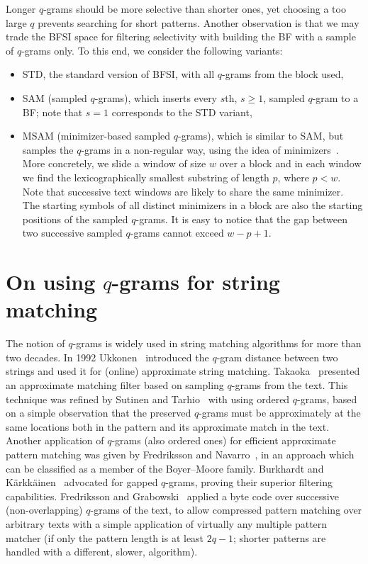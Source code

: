 \documentclass{llncs}
\begin{document}
Longer $q$-grams should be more selective than shorter ones, 
yet choosing a too large $q$ prevents searching for short patterns.
Another observation is that we may trade the BFSI space for filtering 
selectivity with building the BF with a sample of $q$-grams only.
To this end, we consider the following variants:
\begin{itemize}
\item STD, the standard version of BFSI, with all $q$-grams from the block used,
\item SAM (sampled $q$-grams), which inserts every $s$th, $s \geq 1$, 
sampled $q$-gram to a BF; note that $s=1$ corresponds to the STD variant,
\item MSAM (minimizer-based sampled $q$-grams), which is similar to SAM, 
but samples the $q$-grams in a non-regular way, using the idea of 
minimizers~\cite{RHHMY2004}.
More concretely, we slide a window of size $w$ over a block 
and in each window we find the lexicographically smallest substring of length $p$, 
where $p < w$.
Note that successive text windows are likely to share the same minimizer.
The starting symbols of all distinct minimizers in a block are also the starting 
positions of the sampled $q$-grams.
It is easy to notice that the gap between two successive sampled $q$-grams 
cannot exceed $w - p + 1$.
\end{itemize}


\section{On using $q$-grams for string matching}

The notion of $q$-grams 
is widely used in string matching algorithms for more than two decades.
In 1992 Ukkonen~\cite{Ukk1992} introduced the $q$-gram distance between 
two strings and used it for (online) approximate string matching.
Takaoka~\cite{T1994} presented an approximate matching filter based on 
sampling $q$-grams from the text.
This technique was refined by Sutinen and Tarhio~\cite{ST1995} 
with using ordered $q$-grams, based on a simple observation that 
the preserved $q$-grams must be approximately at the same locations 
both in the pattern and its approximate match in the text.
Another application of $q$-grams (also ordered ones) for efficient 
approximate pattern matching was given by Fredriksson and Navarro~\cite{FNjea2004}, 
in an approach which can be classified as a member of the Boyer--Moore family.
Burkhardt and K{\"a}rkk{\"a}inen~\cite{BK2001} advocated for gapped $q$-grams, 
proving their superior filtering capabilities.
Fredriksson and Grabowski~\cite{FG2006} applied a byte code over 
successive (non-overlapping) 
$q$-grams of the text, to allow compressed pattern matching over 
arbitrary texts with a simple application of virtually any multiple pattern 
matcher (if only the pattern length is at least $2q-1$; 
shorter patterns are handled with a different, slower, algorithm).
\end{document}
